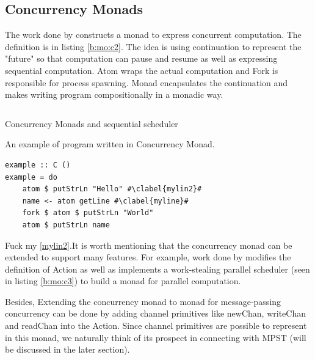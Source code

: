 \subsection{Concurrency Monads}
The work done by \cite{claessenFunctionalPearlsPoor1999} constructs a monad to express concurrent computation. The definition is in listing \ref{b:mo:c2}. The idea is using continuation to represent the "future" so that computation can pause and resume as well as expressing sequential computation. Atom wraps the actual computation and Fork is responsible for process spawning. Monad encapsulates the continuation and makes writing program compositionally in a monadic way.

\begin{listing}[ht]
  \inputminted{haskell}{background/mo-cm.hs}
  \caption{Concurrency Monads and sequential scheduler}
  \label{b:mo:c2}
\end{listing}

An example of program written in Concurrency Monad.
\begin{verbatim}
example :: C ()
example = do 
    atom $ putStrLn "Hello" #\clabel{mylin2}#
    name <- atom getLine #\clabel{myline}#
    fork $ atom $ putStrLn "World"
    atom $ putStrLn name
\end{verbatim}

Fuck my \cref{mylin2}.It is worth mentioning that the concurrency monad can be extended to support many features. For example, work done by \cite{marlowMonadDeterministicParallelism} modifies the definition of Action as well as implements a work-stealing parallel scheduler (seen in listing \ref{b:mo:c3}) to build a monad for parallel computation. 

Besides, Extending the concurrency monad to monad for message-passing concurrency can be done by adding channel primitives like newChan, writeChan and readChan into the Action. Since channel primitives are possible to represent in this monad, we naturally think of its prospect in connecting with MPST (will be discussed in the later section).
\begin{listing}[ht]
  \inputminted{haskell}{background/mo-par.hs}
  \label{b:mo:c3}
\end{listing}

